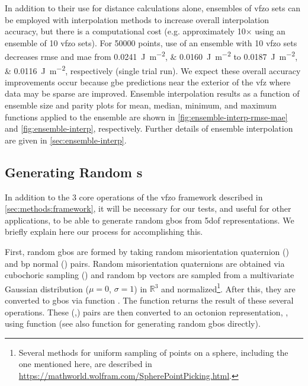 \documentclass[final,twocolumn,12pt]{elsarticle}
\begin{document}
In addition to their use for distance calculations alone, ensembles of \gls{vfzo} sets can be employed with interpolation methods to increase overall interpolation accuracy, but there is a computational cost (e.g. approximately 10$\times$ using an ensemble of 10 \gls{vfzo} sets). For \num{50000} \inpt{} points, use of an ensemble with 10 \gls{vfzo} sets decreases \gls{rmse} and \gls{mae} from \SIlist{0.0241;0.0160}{\J\per\square\m} to \SIlist{0.0187;0.0116}{\J\per\square\m}, respectively (single trial run). We expect these overall accuracy improvements occur because \gls{gbe} predictions near the exterior of the \gls{vfz} where data may be sparse are improved. Ensemble interpolation results as a function of ensemble size and parity plots for mean, median, minimum, and maximum functions applied to the ensemble are shown in \cref{fig:ensemble-interp-rmse-mae} and \cref{fig:ensemble-interp}, respectively. Further details of ensemble interpolation are given in \cref{sec:ensemble-interp}.

\subsection{Generating Random s}
\label{sec:methods:rand}
In addition to the 3 core operations of the \gls{vfzo} framework described in \cref{sec:methods:framework}, it will be necessary for our tests, and useful for other applications, to be able to generate random \glspl{gbo} from \gls{5dof} representations. We briefly explain here our process for accomplishing this. 

First, random \glspl{gbo} are formed by taking random misorientation quaternion () and \gls{bp} normal () pairs. Random misorientation quaternions are obtained via cubochoric sampling \cite{singhOrientationSamplingDictionarybased2016} () and random \gls{bp} vectors are sampled from a multivariate Gaussian distribution ($\mu=0$, $\sigma=1$) in $\mathbb{R}^3$ and normalized\footnote{Several methods for uniform sampling of points on a sphere, including the one mentioned here, are described in \url{https://mathworld.wolfram.com/SpherePointPicking.html}.}. After this, they are converted to \glspl{gbo} via \vfzorepo{} function . The \vfzorepo{} function  returns the result of these several operations. These (,) pairs are then converted to an octonion representation, , using \vfzorepo{} function  (see also \vfzorepo{} function  for generating random \glspl{gbo} directly).
\end{document}
